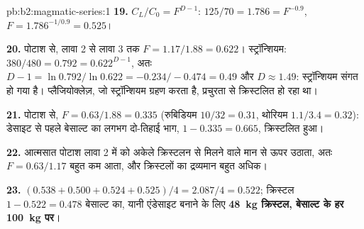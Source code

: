 \begin{solution}{pb:b2:magmatic-series:1}
\textbf{19.} $C_L/C_0 = F^{D - 1}$: $125/70 = 1.786 = F^{-0.9}$, $F = 1.786^{-1/0.9} =
0.525$।

\textbf{20.} पोटाश से, लावा 2 से लावा 3 तक $F = 1.17/1.88 = 0.622$। स्ट्रॉन्शियम:
$380/480 = 0.792 = 0.622^{D - 1}$, अतः $D - 1 = \ln 0.792/\ln 0.622 = -0.234/-0.474 =
0.49$ और $D \approx 1.49$: स्ट्रॉन्शियम संगत हो गया है। प्लैजियोक्लेज़, जो
स्ट्रॉन्शियम ग्रहण करता है, प्रचुरता से क्रिस्टलित हो रहा था।

\textbf{21.} पोटाश से, $F = 0.63/1.88 = 0.335$ (रुबिडियम $10/32 = 0.31$, थोरियम
$1.1/3.4 = 0.32$): डेसाइट से पहले बेसाल्ट का लगभग दो-तिहाई भाग, $1 - 0.335 = 0.665$,
क्रिस्टलित हुआ।

\textbf{22.} आत्मसात पोटाश लावा 2 में  को अकेले क्रिस्टलन से मिलने वाले मान से
ऊपर उठाता, अतः $F = 0.63/1.17$ बहुत कम आता, और क्रिस्टलों का
द्रव्यमान बहुत अधिक।

\textbf{23.} $(0.538 + 0.500 + 0.524 + 0.525)/4 = 2.087/4 = 0.522$; क्रिस्टल $1 - 0.522
= 0.478$ बेसाल्ट का, यानी एंडेसाइट बनाने के लिए \textbf{\qty[text-series-to-math=true]{48}{kg}
क्रिस्टल, बेसाल्ट के हर \qty{100}{kg} पर}।
\end{solution}
